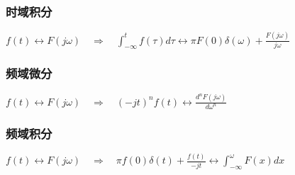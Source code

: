 \documentclass[UTF8]{article}
\theoremstyle{definition}
\begin{document}
\subsubsection{时域积分}
\begin{center}
$f(t) \leftrightarrow F(j \omega)  \quad \Rightarrow \quad \int_{-\infty}^t f(\tau) d \tau \leftrightarrow \pi F(0) \delta(\omega)+\frac{F(j \omega)}{j \omega}$
\end{center}

\subsubsection{频域微分}
\begin{center}
$f(t) \leftrightarrow F(j \omega)  \quad \Rightarrow \quad (-j t)^n f(t) \leftrightarrow \frac{d^n F(j \omega)}{d \omega^n}$
\end{center}

\subsubsection{频域积分}
\begin{center}
$f(t) \leftrightarrow F(j \omega)  \quad \Rightarrow \quad \pi f(0) \delta(t)+\frac{f(t)}{-j t} \leftrightarrow \int_{-\infty}^\omega F(x) d x$
\end{center}
\end{document}

